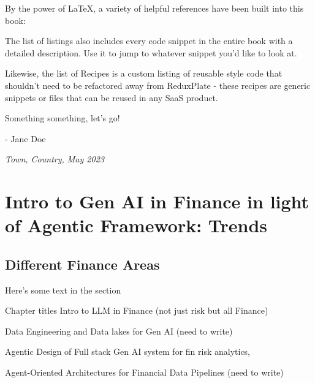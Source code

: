 \documentclass[a4paper,headinclude=on,footinclude=on,12pt,oneside]{scrbook}
\begin{document}

By the power of LaTeX, a variety of helpful references have been built into this book:



The list of listings also includes every code snippet in the entire book with a detailed description. Use it to jump to whatever snippet you'd like to look at.

Likewise, the list of Recipes is a custom listing of reusable style code that shouldn't need to be refactored away from ReduxPlate - these recipes are generic snippets or files that can be reused in any SaaS product.


Something something, let's go!

- Jane Doe

\textit{Town, Country, May 2023}

\chapter{Intro to Gen AI in Finance in light of Agentic Framework: Trends }

\section{Different Finance Areas}



Here's some text in the section

Chapter titles
Intro to LLM in Finance (not just risk but all Finance) 


Data Engineering and Data lakes for Gen AI (need to write)


Agentic Design of Full stack Gen AI system for fin risk analytics,

 Agent-Oriented Architectures for Financial Data Pipelines (need to write) 
 
\end{document}
